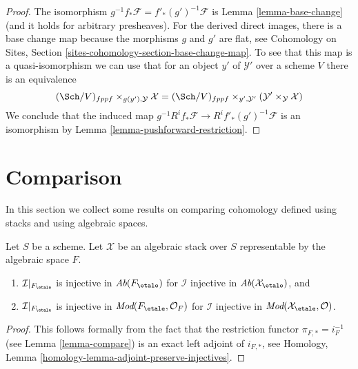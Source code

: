 \begin{proof}
The isomorphism $g^{-1}f_*\mathcal{F} = f'_*(g')^{-1}\mathcal{F}$ is
Lemma \ref{lemma-base-change} (and it holds for arbitrary presheaves).
For the derived direct images, there is a base change map because the
morphisms $g$ and $g'$ are flat, see
Cohomology on Sites, Section \ref{sites-cohomology-section-base-change-map}.
To see that this map is a quasi-isomorphism we can use that for
an object $y'$ of $\mathcal{Y}'$ over a scheme $V$ there is an equivalence
$$
(\Sch/V)_{fppf} \times_{g(y'), \mathcal{Y}} \mathcal{X}
=
(\Sch/V)_{fppf} \times_{y', \mathcal{Y}'}
(\mathcal{Y}' \times_\mathcal{Y} \mathcal{X})
$$
We conclude that the induced map
$g^{-1}R^if_*\mathcal{F} \to R^if'_*(g')^{-1}\mathcal{F}$
is an isomorphism by
Lemma \ref{lemma-pushforward-restriction}.
\end{proof}












\section{Comparison}
\label{section-compare}

\noindent
In this section we collect some results on comparing cohomology defined
using stacks and using algebraic spaces.

\begin{lemma}
\label{lemma-compare-injectives}
Let $S$ be a scheme.
Let $\mathcal{X}$ be an algebraic stack over $S$
representable by the algebraic
space $F$.
\begin{enumerate}
\item $\mathcal{I}|_{F_\etale}$ is injective in
$\textit{Ab}(F_\etale)$ for $\mathcal{I}$ injective in
$\textit{Ab}(\mathcal{X}_\etale)$, and
\item $\mathcal{I}|_{F_\etale}$ is injective in
$\textit{Mod}(F_\etale, \mathcal{O}_F)$
for $\mathcal{I}$ injective in
$\textit{Mod}(\mathcal{X}_\etale, \mathcal{O})$.
\end{enumerate}
\end{lemma}

\begin{proof}
This follows formally from the fact that the restriction functor
$\pi_{F, *} = i_F^{-1}$ (see
Lemma \ref{lemma-compare})
is an exact left adjoint of $i_{F, *}$, see
Homology, Lemma \ref{homology-lemma-adjoint-preserve-injectives}.
\end{proof}

